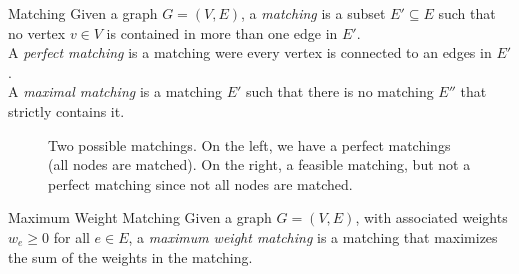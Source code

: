 \begin{definition}{Matching}{}
Given a graph $G = (V,E)$, a \emph{matching} is a subset $E' \subseteq E$ such that no vertex $v \in V$ is contained in more than one edge in $E'$.  \\
A \emph{perfect matching} is a matching were every vertex is connected to an edges in $E'$.\\
A \emph{maximal matching} is a matching $E'$ such that there is no matching $E''$ that strictly contains it.
\end{definition}


\begin{figure}[H]
\label{fig:matching}
\caption{Two possible matchings.  On the left, we have a perfect matchings (all nodes are matched).  On the right, a feasible matching, but not a perfect matching since not all nodes are matched.}

\end{figure}







\begin{definition}{Maximum Weight Matching}{}
Given a graph $G = (V,E)$, with associated weights $w_e\geq 0$ for all $e \in E$, a \emph{maximum weight matching} is a matching that maximizes the sum of the weights in the matching.
\end{definition}







%
%
